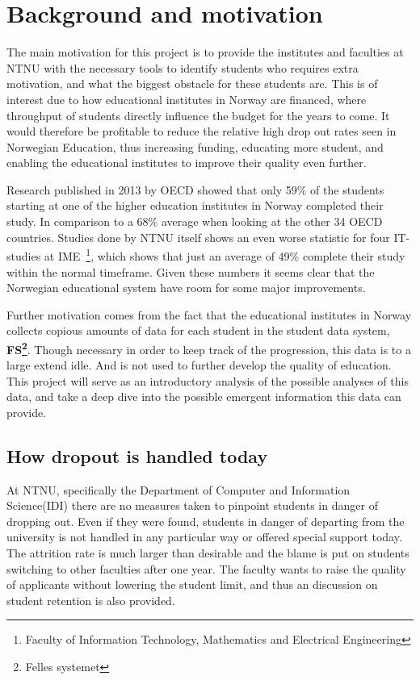 \section{Background and motivation}
	The main motivation for this project is to provide the institutes and faculties at NTNU 
	with the necessary tools to identify students who requires extra motivation, and what the biggest obstacle for these students are.
	This is of interest due to how educational institutes in Norway are financed, 
	where throughput of students directly influence the budget for the years to come\cite{finansiering}. 
	It would therefore be profitable to reduce the relative high drop out rates seen in Norwegian Education, 
	thus increasing funding, educating more student, and enabling the educational institutes to improve their quality even further.
	
	\bigskip\noindent
	Research published in 2013 by OECD showed that only 59\% of the students
	starting at one of the higher education institutes in Norway completed their study.
	In comparison to a 68\% average when looking at the other 34 OECD countries\cite{OECD2013}.
	Studies done by NTNU itself shows an even worse statistic for four IT-studies at IME~\footnote{Faculty of Information Technology, Mathematics and Electrical Engineering},	which shows that just an average of 49\%\cite{ntnu:dropout} complete their study within the normal timeframe.
	Given these numbers it seems clear that the Norwegian educational system have room for some major improvements. 

	\bigskip\noindent
	Further motivation comes from the fact that the educational institutes in Norway collects
	copious amounts of data for each student in the student data system, \textbf{FS\footnote{Felles systemet}}. 
	Though necessary in order to keep track of the progression, 
	this data is to a large extend idle. And is not used to further develop the quality of education. 
	This project will serve as an introductory analysis of the possible analyses of this data, 
	and take a deep dive into the possible emergent information this data can provide. 
	
\subsection{How dropout is handled today}
At NTNU, specifically the Department of Computer and Information Science(IDI) there are no measures taken to pinpoint students in danger of dropping out.
Even if they were found, students in danger of departing from the university is not handled in any particular way or offered special support today.
The attrition rate is much larger than desirable and the blame is put on students switching to other faculties after one year.
The faculty wants to raise the quality of applicants without lowering the student limit, and thus an discussion on student retention is also provided. 

